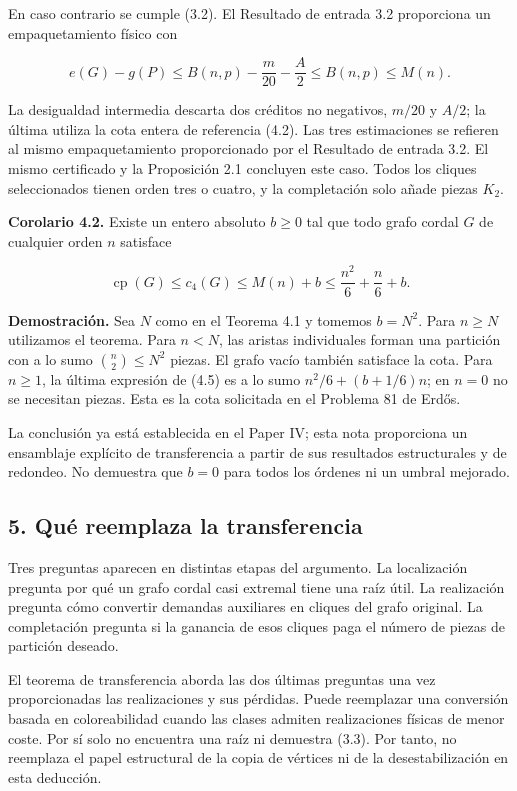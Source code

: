 \documentclass[spanish,11pt,a4paper]{article}
\begin{document}
En caso contrario se cumple (3.2). El Resultado de entrada 3.2
proporciona un empaquetamiento físico con

\[
e(G)-g(P)\le B(n,p)-\frac m{20}-\frac A2
\le B(n,p)\le M(n).
\tag{4.4}
\]

La desigualdad intermedia descarta dos créditos no negativos, \(m/20\) y
\(A/2\); la última utiliza la cota entera de referencia (4.2). Las tres
estimaciones se refieren al mismo empaquetamiento proporcionado por el
Resultado de entrada 3.2. El mismo certificado y la Proposición 2.1
concluyen este caso. Todos los cliques seleccionados tienen orden tres o
cuatro, y la completación solo añade piezas \(K_2\).

\textbf{Corolario 4.2.} Existe un entero absoluto \(b\ge0\) tal que todo
grafo cordal \(G\) de cualquier orden \(n\) satisface

\[
\operatorname{cp}(G)\le c_4(G)\le M(n)+b
\le\frac{n^2}{6}+\frac n6+b.
\tag{4.5}
\]

\textbf{Demostración.} Sea \(N\) como en el Teorema 4.1 y tomemos
\(b=N^2\). Para \(n\ge N\) utilizamos el teorema. Para \(n<N\), las
aristas individuales forman una partición con a lo sumo
\(\binom n2\le N^2\) piezas. El grafo vacío también satisface la cota.
Para \(n\ge1\), la última expresión de (4.5) es a lo sumo
\(n^2/6+(b+1/6)n\); en \(n=0\) no se necesitan piezas. Esta es la cota
solicitada en el Problema 81 de Erdős.

La conclusión ya está establecida en el Paper IV; esta nota proporciona
un ensamblaje explícito de transferencia a partir de sus resultados
estructurales y de redondeo. No demuestra que \(b=0\) para todos los
órdenes ni un umbral mejorado.

\subsection{5. Qué reemplaza la
transferencia}\label{quuxe9-reemplaza-la-transferencia}

Tres preguntas aparecen en distintas etapas del argumento. La
localización pregunta por qué un grafo cordal casi extremal tiene una
raíz útil. La realización pregunta cómo convertir demandas auxiliares en
cliques del grafo original. La completación pregunta si la ganancia de
esos cliques paga el número de piezas de partición deseado.

El teorema de transferencia aborda las dos últimas preguntas una vez
proporcionadas las realizaciones y sus pérdidas. Puede reemplazar una
conversión basada en coloreabilidad cuando las clases admiten
realizaciones físicas de menor coste. Por sí solo no encuentra una raíz
ni demuestra (3.3). Por tanto, no reemplaza el papel estructural de la
copia de vértices ni de la desestabilización en esta deducción.
\end{document}
